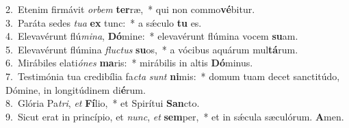 {2.~}Etenim firmávit \textit{or}\textit{bem} \textbf{ter}ræ,~* qui non commo\textbf{vé}bitur.\\
{3.~}Paráta sedes \textit{tu}\textit{a} \textbf{ex} tunc:~* a sǽculo \textbf{tu} es.\\
{4.~}Elevavérunt flú\textit{mi}\textit{na}, \textbf{Dó}mine:~* elevavérunt flúmina vocem \textbf{su}am.\\
{5.~}Elevavérunt flúmina \textit{flu}\textit{ctus} \textbf{su}os,~* a vócibus aquárum mul\textbf{tá}rum.\\
{6.~}Mirábiles elati\textit{ó}\textit{nes} \textbf{ma}ris:~* mirábilis in altis \textbf{Dó}minus.\\
{7.~}Testimónia tua credibília fa\textit{cta} \textit{sunt} \textbf{ni}mis:~* domum tuam decet sanctitúdo, Dómine, in longitúdinem di\textbf{é}rum.\\
{8.~}Glória Pa\textit{tri}, \textit{et} \textbf{Fí}lio,~* et Spirítui \textbf{San}cto.\\
{9.~}Sicut erat in princípio, et \textit{nunc}, \textit{et} \textbf{sem}per,~* et in sǽcula sæculórum. \textbf{A}men.\\
